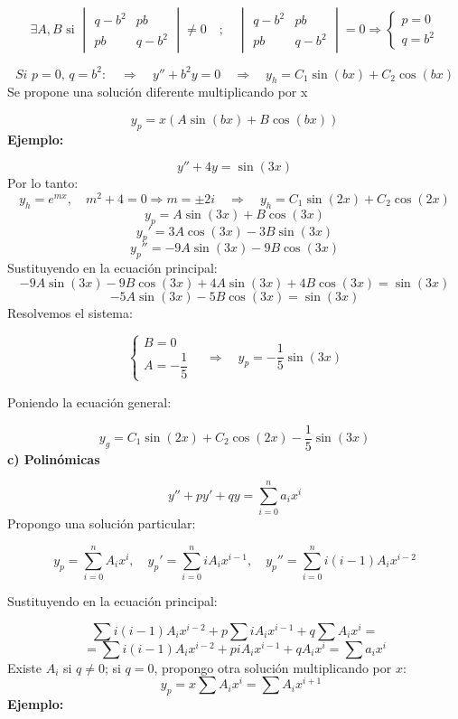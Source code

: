 \documentclass[a4paper,12pt]{article}
\begin{document}
\[
\exists A, B \text{ si } 
\begin{vmatrix}
q - b^2 & p b \\
p b & q - b^2
\end{vmatrix}
\neq 0 
\quad ; \quad 
\begin{vmatrix}
q - b^2 & p b \\
p b & q - b^2
\end{vmatrix}
= 0 \Rightarrow 
\begin{cases}
p = 0 \\
q = b^2
\end{cases}
\]

\newpage
\noindent
\[
\textit{Si } p = 0, \, q = b^2:
\quad \Rightarrow \quad 
y'' + b^2 y = 0 
\quad \Rightarrow \quad 
y_h = C_1 \sin(bx) + C_2 \cos(bx)
\]
Se propone una solución diferente multiplicando por x

\[
y_p = x (A \sin(bx) + B \cos(bx))
\]
\noindent
\textbf{Ejemplo:}

\[
y'' + 4y = \sin(3x)
\]
Por lo tanto:
\vspace{0,1 em}
\[
y_h = e^{mx}, \quad m^2 + 4 = 0 \Rightarrow m = \pm 2i
\quad \Rightarrow \quad 
y_h = C_1 \sin(2x) + C_2 \cos(2x)
\]
\[
y_p = A \sin(3x) + B \cos(3x)
\]
\[
y_p' = 3A \cos(3x) - 3B \sin(3x)
\]
\[
y_p'' = -9A \sin(3x) - 9B \cos(3x)
\]
Sustituyendo en la ecuación principal:
\vspace{0,1 em}
\[
-9A \sin(3x) - 9B \cos(3x) + 4A \sin(3x) + 4B \cos(3x) = \sin(3x)
\]
\[
-5A \sin(3x) - 5B \cos(3x) = \sin(3x)
\]
Resolvemos el sistema:

\[
\begin{cases}
B = 0 \\
A = -\dfrac{1}{5}
\end{cases}
\quad \Rightarrow \quad 
y_p = -\dfrac{1}{5} \sin(3x)
\]

\medskip
\noindent
Poniendo la ecuación general:

\[
y_g = C_1 \sin(2x) + C_2 \cos(2x) - \dfrac{1}{5} \sin(3x)
\]
\noindent
\textbf{c) Polinómicas}

\[
y'' + p y' + q y = \sum_{i=0}^{n} a_i x^i
\]
Propongo una solución particular:

\[
y_p = \sum_{i=0}^{n} A_i x^i, 
\quad y_p' = \sum_{i=0}^{n} i A_i x^{i-1}, 
\quad y_p'' = \sum_{i=0}^{n} i(i-1) A_i x^{i-2}
\]

\newpage
\noindent
Sustituyendo en la ecuación principal:

\[
\sum i(i-1)A_i x^{i-2} + p \sum i A_i x^{i-1} + q \sum A_i x^i =
\]
\[
= \sum i(i-1)A_i x^{i-2} + p i A_i x^{i-1} + q A_i x^i = \sum a_i x^i
\]
\noindent
Existe \( A_i \) si \( q \neq 0 \); si \( q = 0 \), propongo otra solución multiplicando por \( x \):
\[
\quad y_p = x \sum A_i x^i = \sum A_i x^{i+1}
\]
\noindent
\textbf{Ejemplo:}
\end{document}
